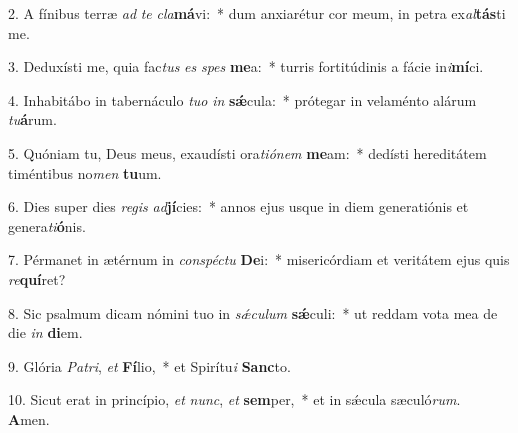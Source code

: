 2. A fínibus terræ \textit{ad} \textit{te} \textit{cla}\textbf{má}vi:~*  dum anxiarétur cor meum, in petra ex\textit{al}\textbf{tás}ti me.\

3. Deduxísti me, quia fac\textit{tus} \textit{es} \textit{spes} \textbf{me}a:~*  turris fortitúdinis a fácie in\textit{i}\textbf{mí}ci.\

4. Inhabitábo in tabernáculo \textit{tu}\textit{o} \textit{in} \textbf{sǽ}cula:~*  prótegar in velaménto alárum \textit{tu}\textbf{á}rum.\

5. Quóniam tu, Deus meus, exaudísti ora\textit{ti}\textit{ó}\textit{nem} \textbf{me}am:~*  dedísti hereditátem timéntibus no\textit{men} \textbf{tu}um.\

6. Dies super dies \textit{re}\textit{gis} \textit{ad}\textbf{jí}cies:~*  annos ejus usque in diem generatiónis et genera\textit{ti}\textbf{ó}nis.\

7. Pérmanet in ætérnum in \textit{con}\textit{spéc}\textit{tu} \textbf{De}i:~*  misericórdiam et veritátem ejus quis \textit{re}\textbf{quí}ret?\

8. Sic psalmum dicam nómini tuo in \textit{sǽ}\textit{cu}\textit{lum} \textbf{sǽ}culi:~*  ut reddam vota mea de die \textit{in} \textbf{di}em.\

9. Glória \textit{Pa}\textit{tri}, \textit{et} \textbf{Fí}lio,~*  et Spirítu\textit{i} \textbf{Sanc}to.\

10. Sicut erat in princípio, \textit{et} \textit{nunc}, \textit{et} \textbf{sem}per,~*  et in sǽcula sæculó\textit{rum}. \textbf{A}men.\

